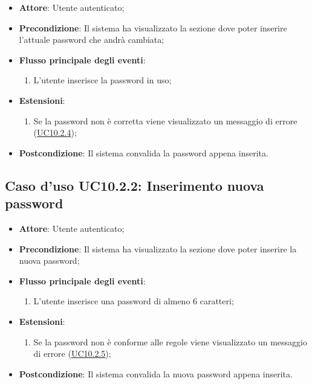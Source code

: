 \documentclass[12pt,a4paper]{article}
\begin{document}
\begin{itemize}

\item \textbf{Attore}: Utente autenticato; 
\item \textbf{Precondizione}: Il sistema ha visualizzato la sezione dove poter inserire l’attuale password che andrà cambiata;

\item \textbf{Flusso principale degli eventi}:
\begin{enumerate}
	\item L'utente inserisce la password in uso;
	
\end{enumerate}
\item \textbf{Estensioni}:
\begin{enumerate}
	\item Se la password non è corretta viene visualizzato un messaggio di errore (\hyperlink{UC10.2.4}{UC10.2.4});
	
\end{enumerate}
\item \textbf{Postcondizione}: Il sistema convalida la password appena inserita.
\end{itemize}
\hypertarget{UC10.2.2}{}
\subsection{Caso d'uso UC10.2.2:  Inserimento nuova password}

\begin{itemize}

\item \textbf{Attore}: Utente autenticato; 
\item \textbf{Precondizione}: Il sistema ha visualizzato la sezione dove poter inserire la nuova password;

\item \textbf{Flusso principale degli eventi}:
\begin{enumerate}
	\item L'utente inserisce una password di almeno 6 caratteri;
	
\end{enumerate}
\item \textbf{Estensioni}:
\begin{enumerate}
	\item Se la password non è conforme alle regole viene visualizzato un messaggio di errore (\hyperlink{UC10.2.5}{UC10.2.5});
	
\end{enumerate}
\item \textbf{Postcondizione}: Il sistema convalida la nuova password appena inserita.
\end{itemize}
\hypertarget{UC10.2.3}{}
\end{document}

